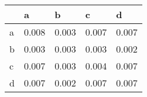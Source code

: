 \begin{tabular}{lllll}
\toprule
{} &      a &      b &      c &      d \\
\midrule
a &  0.008 &  0.003 &  0.007 &  0.007 \\
b &  0.003 &  0.003 &  0.003 &  0.002 \\
c &  0.007 &  0.003 &  0.004 &  0.007 \\
d &  0.007 &  0.002 &  0.007 &  0.007 \\
\bottomrule
\end{tabular}
